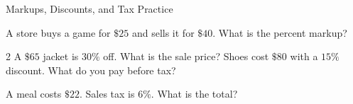 
\newpage
\begin{stepPractice}{Markups, Discounts, and Tax Practice}
    \resetProblems

    \prob A store buys a game for $\$25$ and sells it for $\$40$. What is the percent markup? \answerBlank[2cm]

    \begin{multicols}{2}
    \prob A $\$65$ jacket is $30\%$ off. What is the sale price? \answerBlank[2cm]
    \prob Shoes cost $\$80$ with a $15\%$ discount. What do you pay before tax? \answerBlank[2cm]
    \end{multicols}

    \prob A meal costs $\$22$. Sales tax is $6\%$. What is the total? \answerBlank[2cm]

\end{stepPractice}
